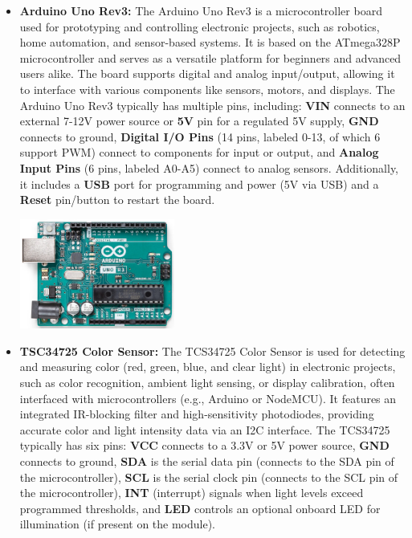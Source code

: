 \documentclass[conference, onecolumn]{IEEEtran}
\begin{document}
\begin{itemize}
    \item \textbf{Arduino Uno Rev3:} The Arduino Uno Rev3 is a microcontroller board used for prototyping and controlling electronic projects, such as robotics, home automation, and sensor-based systems. It is based on the ATmega328P microcontroller and serves as a versatile platform for beginners and advanced users alike. The board supports digital and analog input/output, allowing it to interface with various components like sensors, motors, and displays. The Arduino Uno Rev3 typically has multiple pins, including: \textbf{VIN} connects to an external 7-12V power source or \textbf{5V} pin for a regulated 5V supply, \textbf{GND} connects to ground, \textbf{Digital I/O Pins} (14 pins, labeled 0-13, of which 6 support PWM) connect to components for input or output, and \textbf{Analog Input Pins} (6 pins, labeled A0-A5) connect to analog sensors. Additionally, it includes a \textbf{USB} port for programming and power (5V via USB) and a \textbf{Reset} pin/button to restart the board.
  \vspace{1em}
    \begin{center}
    \includegraphics[width=0.4\textwidth]{IOT-Color-Based Object Sorting Machine/Arduino_Uno.jpg}
     \vspace{1em}
    \label{fig2}
    \end{center}

\vspace{6em}
    \item \textbf {TSC34725 Color Sensor:} The TCS34725 Color Sensor is used for detecting and measuring color (red, green, blue, and clear light) in electronic projects, such as color recognition, ambient light sensing, or display calibration, often interfaced with microcontrollers (e.g., Arduino or NodeMCU). It features an integrated IR-blocking filter and high-sensitivity photodiodes, providing accurate color and light intensity data via an I2C interface. The TCS34725 typically has six pins: \textbf{VCC} connects to a 3.3V or 5V power source, \textbf{GND} connects to ground, \textbf{SDA} is the serial data pin (connects to the SDA pin of the microcontroller), \textbf{SCL} is the serial clock pin (connects to the SCL pin of the microcontroller), \textbf{INT} (interrupt) signals when light levels exceed programmed thresholds, and \textbf{LED} controls an optional onboard LED for illumination (if present on the module). 


\end{itemize}
\end{document}
